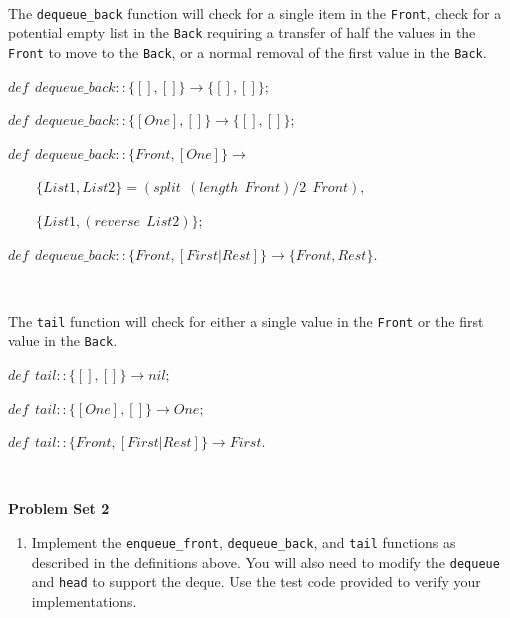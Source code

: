 \documentclass[
]{book}
\providecommand{\tightlist}{%
  \setlength{\itemsep}{0pt}\setlength{\parskip}{0pt}}
\begin{document}
\(\nonumber\)

The \texttt{dequeue\_back} function will check for a single item in the \texttt{Front}, check for a potential empty list in the \texttt{Back} requiring a transfer of half the values in the \texttt{Front} to move to the \texttt{Back}, or a normal removal of the first value in the \texttt{Back}.

\begin{formulabox}
\(de\mathit{f} ~ ~ dequeue\_back :: \lbrace [], [] \rbrace \rightarrow \lbrace [], [] \rbrace;\)

\(de\mathit{f} ~ ~ dequeue\_back :: \lbrace [One], [] \rbrace \rightarrow \lbrace [], [] \rbrace;\)

\(de\mathit{f} ~ ~ dequeue\_back :: \lbrace Front, [One] \rbrace \rightarrow\)

\(\quad \quad \lbrace List1, List2 \rbrace = (split ~ ~ (length ~ ~ Front) / 2 ~ ~ Front),\)

\(\quad \quad \lbrace List1, (reverse ~ ~ List2) \rbrace;\)

\(de\mathit{f} ~ ~ dequeue\_back :: \lbrace Front, [First|Rest] \rbrace \rightarrow \lbrace Front, Rest \rbrace.\)

\end{formulabox}

\(\nonumber\)

The \texttt{tail} function will check for either a single value in the \texttt{Front} or the first value in the \texttt{Back}.

\begin{formulabox}
\(de\mathit{f} ~ ~ tail :: \lbrace [], [] \rbrace \rightarrow nil;\)

\(de\mathit{f} ~ ~ tail :: \lbrace [One], [] \rbrace \rightarrow One;\)

\(de\mathit{f} ~ ~ tail :: \lbrace Front, [First|Rest] \rbrace \rightarrow First.\)

\end{formulabox}

\(\nonumber\)

\begin{problembox}

\textbf{Problem Set 2}

\begin{enumerate}
\def\labelenumi{\arabic{enumi}.}
\tightlist
\item
  Implement the \texttt{enqueue\_front}, \texttt{dequeue\_back}, and \texttt{tail} functions as described in the definitions above. You will also need to modify the \texttt{dequeue} and \texttt{head} to support the deque. Use the test code provided to verify your implementations.
\end{enumerate}

\end{problembox}
\end{document}
